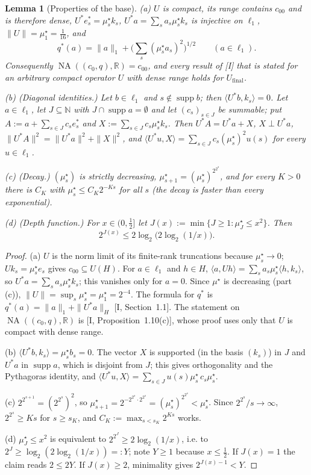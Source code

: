 \documentclass[10pt]{amsart}
\newtheorem{lemma}[theorem]{Lemma}
\theoremstyle{definition}
\theoremstyle{remark}
\newcommand{\NA}{\operatorname{NA}}
\newcommand{\supp}{\operatorname{supp}}
\newcommand{\R}{\mathbb R}
\newcommand{\N}{\mathbb N}
\newcommand{\ip}[2]{\langle #1,#2\rangle}
\begin{document}
\begin{lemma}[Properties of the base]\label{lem:II-base}
\textup{(a)} $U$ is compact, its range contains $c_{00}$ and is therefore
dense, $U^*e_s^*=\mu^\star_sk_s$, $U^*a=\sum_sa_s\mu^\star_sk_s$ is
injective on $\ell_1$, $\|U\|=\mu^\star_1=\frac1{16}$, and
\[
 q^*(a)=\|a\|_1+\Big(\sum_s(\mu^\star_sa_s)^2\Big)^{1/2}\qquad(a\in\ell_1).
\]
Consequently $\NA((c_0,q),\R)=c_{00}$, and every result of
[I] that is stated for an arbitrary compact operator $U$ with
dense range holds for $U_{\mathrm{final}}$.

\textup{(b)} \textup{(Diagonal identities.)}  Let $b\in\ell_1$ and
$s\notin\supp b$; then $\ip{U^*b}{k_s}=0$.  Let $a\in\ell_1$, let
$J\subseteq\N$ with $J\cap\supp a=\emptyset$ and let $(c_s)_{s\in J}$ be
summable; put $A:=a+\sum_{s\in J}c_se_s^*$ and
$X:=\sum_{s\in J}c_s\mu^\star_sk_s$.  Then $U^*A=U^*a+X$, $X\perp U^*a$,
$\|U^*A\|^2=\|U^*a\|^2+\|X\|^2$, and
$\ip{U^*u}{X}=\sum_{s\in J}c_s(\mu^\star_s)^2u(s)$ for every
$u\in\ell_1$.

\textup{(c)} \textup{(Decay.)}  $(\mu^\star_s)$ is strictly decreasing,
$\mu^\star_{s+1}=(\mu^\star_s)^{2^{2^s}}$, and for every $K>0$ there is
$C_K$ with $\mu^\star_s\le C_K2^{-Ks}$ for all $s$ \textup{(}the decay is
faster than every exponential\textup{)}.

\textup{(d)} \textup{(Depth function.)}  For $x\in(0,\frac12]$ let
$J(x):=\min\{J\ge1:\mu^\star_J\le x^2\}$.  Then
\[
 2^{J(x)}\le2\log_2\big(2\log_2(1/x)\big).
\]
\end{lemma}

\begin{proof}
(a) $U$ is the norm limit of its finite-rank truncations because
$\mu^\star_s\to0$; $Uk_s=\mu^\star_se_s$ gives $c_{00}\subseteq U(H)$.
For $a\in\ell_1$ and $h\in H$, $\ip{a}{Uh}=\sum_sa_s\mu^\star_s\ip{h}{k_s}$,
so $U^*a=\sum_sa_s\mu^\star_sk_s$; this vanishes only for $a=0$.  Since
$\mu^\star$ is decreasing (part (c)), $\|U\|=\sup_s\mu^\star_s=\mu^\star_1
=2^{-4}$.  The formula for $q^*$ is $q^*(a)=\|a\|_1+\|U^*a\|_H$
[I, Section~1.1].  The statement on $\NA((c_0,q),\R)$ is
[I, Proposition~1.10(c)], whose proof uses only that $U$ is
compact with dense range.

(b) $\ip{U^*b}{k_s}=\mu^\star_sb_s=0$.  The vector $X$ is supported (in
the basis $(k_s)$) in $J$ and $U^*a$ in $\supp a$, which is disjoint from
$J$; this gives orthogonality and the Pythagoras identity, and
$\ip{U^*u}{X}=\sum_{s\in J}u(s)\mu^\star_s\,c_s\mu^\star_s$.

(c) $2^{2^{s+1}}=(2^{2^s})^2$, so $\mu^\star_{s+1}=2^{-2^{2^s}\cdot
2^{2^s}}=(\mu^\star_s)^{2^{2^s}}<\mu^\star_s$.  Since $2^{2^s}/s\to\infty$,
$2^{2^s}\ge Ks$ for $s\ge s_K$, and $C_K:=\max_{s<s_K}2^{Ks}$ works.

(d) $\mu^\star_J\le x^2$ is equivalent to $2^{2^J}\ge2\log_2(1/x)$, i.e.
to $2^J\ge\log_2(2\log_2(1/x))=:Y$; note $Y\ge1$ because $x\le\frac12$.
If $J(x)=1$ the claim reads $2\le2Y$.  If $J(x)\ge2$, minimality gives
$2^{J(x)-1}<Y$.
\end{proof}
\end{document}
